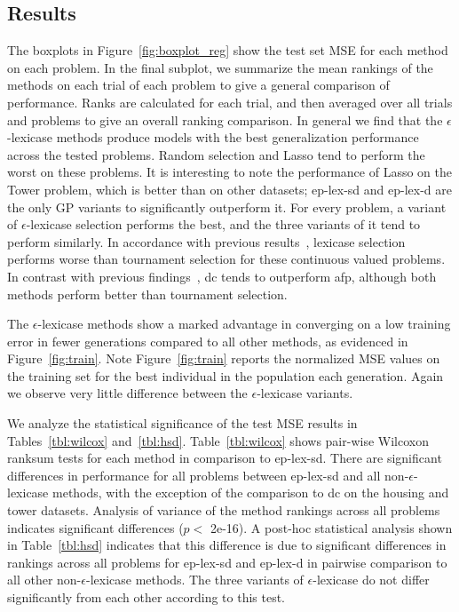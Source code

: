 \documentclass[twoside]{article}
\begin{document}
\subsection{Results}\label{s:results}
The boxplots in Figure~\ref{fig:boxplot_reg} show the test set MSE for each method on each problem. In the final subplot, we summarize the mean rankings of the methods on each trial of each problem to give a general comparison of performance. Ranks are calculated for each trial, and then averaged over all trials and problems to give an overall ranking comparison. In general we find that the $\epsilon$-lexicase methods produce models with the best generalization performance across the tested problems. Random selection and Lasso tend to perform the worst on these problems. It is interesting to note the performance of Lasso on the Tower problem, which is better than on other datasets; ep-lex-sd and ep-lex-d are the only GP variants to significantly outperform it. For every problem, a variant of $\epsilon$-lexicase selection performs the best, and the three variants of it tend to perform similarly. In accordance with previous results~\citep{la_cava_epsilon-lexicase_2016}, lexicase selection performs worse than tournament selection for these continuous valued problems. In contrast with previous findings~\citep{schmidt_age-fitness_2011}, dc tends to outperform afp, although both methods perform better than tournament selection. 

The $\epsilon$-lexicase methods show a marked advantage in converging on a low training error in fewer generations compared to all other methods, as evidenced in Figure~\ref{fig:train}. Note Figure~\ref{fig:train} reports the normalized MSE values on the training set for the best individual in the population each generation. Again we observe very little difference between the $\epsilon$-lexicase variants. 

We analyze the statistical significance of the test MSE results in Tables~\ref{tbl:wilcox} and~\ref{tbl:hsd}. Table~\ref{tbl:wilcox} shows pair-wise Wilcoxon ranksum tests for each method in comparison to ep-lex-sd. There are significant differences in performance for all problems between ep-lex-sd and all non-$\epsilon$-lexicase methods, with the exception of the comparison to dc on the housing and tower datasets. Analysis of variance of the method rankings across all problems indicates significant differences ($p<$ 2e-16). A post-hoc statistical analysis shown in Table~\ref{tbl:hsd} indicates that this difference is due to significant differences in rankings across all problems for ep-lex-sd and ep-lex-d in pairwise comparison to all other non-$\epsilon$-lexicase methods. The three variants of $\epsilon$-lexicase do not differ significantly from each other according to this test.
\end{document}
